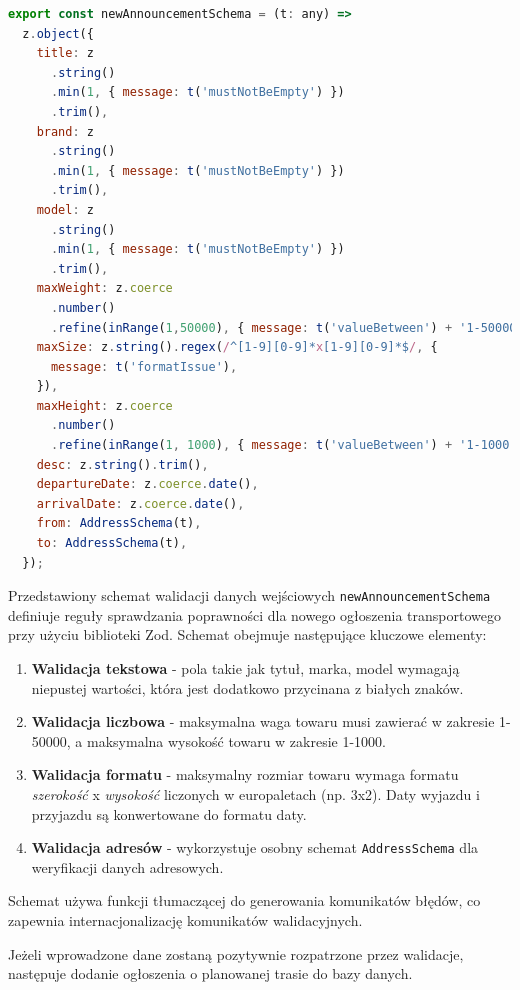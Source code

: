 {\belowcaptionskip=-9pt
\begin{lstlisting}[language=JavaScript,caption=Schemat walidacji danych wejściowych, label=lst:addAnnouncementSchema]
export const newAnnouncementSchema = (t: any) =>
  z.object({
    title: z
      .string()
      .min(1, { message: t('mustNotBeEmpty') })
      .trim(),
    brand: z
      .string()
      .min(1, { message: t('mustNotBeEmpty') })
      .trim(),
    model: z
      .string()
      .min(1, { message: t('mustNotBeEmpty') })
      .trim(),
    maxWeight: z.coerce
      .number()
      .refine(inRange(1,50000), { message: t('valueBetween') + '1-50000' }),
    maxSize: z.string().regex(/^[1-9][0-9]*x[1-9][0-9]*$/, {
      message: t('formatIssue'),
    }),
    maxHeight: z.coerce
      .number()
      .refine(inRange(1, 1000), { message: t('valueBetween') + '1-1000' }),
    desc: z.string().trim(),
    departureDate: z.coerce.date(),
    arrivalDate: z.coerce.date(),
    from: AddressSchema(t),
    to: AddressSchema(t),
  });
\end{lstlisting}
}

Przedstawiony schemat walidacji danych wejściowych \texttt{newAnnouncementSchema} definiuje reguły sprawdzania poprawności dla nowego ogłoszenia transportowego przy użyciu biblioteki Zod. Schemat obejmuje następujące kluczowe elementy:
\begin{enumerate}
    \item \textbf{Walidacja tekstowa} - pola takie jak tytuł, marka, model wymagają niepustej wartości, która jest dodatkowo przycinana z białych znaków.
    \item \textbf{Walidacja liczbowa} - maksymalna waga towaru musi zawierać w zakresie 1-50000, a maksymalna wysokość towaru w zakresie 1-1000.
    \item \textbf{Walidacja formatu} - maksymalny rozmiar towaru wymaga formatu \emph{szerokość} x \emph{wysokość} liczonych w europaletach (np. 3x2). Daty wyjazdu i przyjazdu są konwertowane do formatu daty.
    \item \textbf{Walidacja adresów} - wykorzystuje osobny schemat \texttt{AddressSchema} dla weryfikacji danych adresowych.
\end{enumerate}
Schemat używa funkcji tłumaczącej do generowania komunikatów błędów, co zapewnia internacjonalizację komunikatów walidacyjnych.

Jeżeli wprowadzone dane zostaną pozytywnie rozpatrzone przez walidacje, następuje dodanie ogłoszenia o planowanej trasie do bazy danych.

